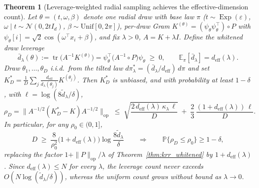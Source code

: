 \documentclass{article}
\newtheorem{theorem}{Theorem}[section]
\DeclareMathOperator{\Exp}{Exp}
\begin{document}
\begin{theorem}[Leverage-weighted radial sampling achieves the effective-dimension count]\label{thm:krr_leverage}
Let $\theta=(t,\omega,\beta)$ denote one radial draw with base law $\pi$ ($t\sim\Exp(\varepsilon)$, $\omega\mid t\sim\mathcal{N}(0,2tI_d)$, $\beta\sim\mathrm{Unif}[0,2\pi]$), per-draw Gram $K^{(\theta)}=(\psi_\theta\psi_\theta^\top)\circ P$ with $\psi_\theta[i]=\sqrt2\cos(\omega^\top x_i+\beta)$, and fix $\lambda>0$, $A=K+\lambda I$. Define the \emph{whitened draw leverage}
\[
\bar d_\lambda(\theta) := \operatorname{tr}\!\bigl(A^{-1}K^{(\theta)}\bigr)=\psi_\theta^\top\bigl(A^{-1}\circ P\bigr)\psi_\theta\;\ge\;0,
\qquad \mathbb{E}_\pi[\bar d_\lambda]=d_{\mathrm{eff}}(\lambda).
\]
Draw $\theta_1,\dots,\theta_D$ i.i.d.\ from the tilted law $d\pi^*_\lambda=(\bar d_\lambda/d_{\mathrm{eff}})\,d\pi$ and set $K^*_D=\frac1D\sum_j \frac{d_{\mathrm{eff}}}{\bar d_\lambda(\theta_j)}K^{(\theta_j)}$. Then $K^*_D$ is unbiased, and with probability at least $1-\delta$, with $\ell=\log(8\tilde d_\lambda/\delta)$,
\begin{equation}\label{eq:leverage_tail}
\rho_D=\bigl\|A^{-1/2}(K^*_D-K)A^{-1/2}\bigr\|_{\mathrm{op}}\;\le\;\sqrt{\frac{2\,d_{\mathrm{eff}}(\lambda)\,\kappa_\lambda\,\ell}{D}}\;+\;\frac{2}{3}\,\frac{(1+d_{\mathrm{eff}}(\lambda))\,\ell}{D}.
\end{equation}
In particular, for any $\rho_0\in(0,1]$,
\begin{equation}\label{eq:leverage_count}
D\;\ge\;\frac{8}{\rho_0^{2}}\bigl(1+d_{\mathrm{eff}}(\lambda)\bigr)\log\frac{8\tilde d_\lambda}{\delta}
\qquad\Longrightarrow\qquad \mathbb{P}\{\rho_D\le\rho_0\}\ge1-\delta,
\end{equation}
replacing the factor $1+\|P\|_{\mathrm{op}}/\lambda$ of Theorem~\ref{thm:krr_whitened} by $1+d_{\mathrm{eff}}(\lambda)$. Since $d_{\mathrm{eff}}(\lambda)\le N$ for every $\lambda$, the leverage count never exceeds $O(N\log(\tilde d_\lambda/\delta))$, whereas the uniform count grows without bound as $\lambda\to0$.
\end{theorem}
\end{document}
